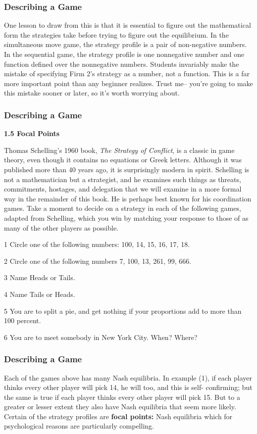  \begin{frame}[fragile]\frametitle{Describing a Game}
  One lesson to draw from this is that it is essential to figure out the
mathematical form the strategies take before trying to figure out the
equilibrium. In the simultaneous move game, the strategy profile is a pair of
non-negative numbers. In the sequential game, the strategy profile is  one
nonnegative number and one function defined over the nonnegative numbers.
Students invariably make the mistake of specifying Firm 2's strategy as a
number,   not  a function. This is a far more important point than any beginner
realizes. Trust me-- you're going to make this mistake sooner or later, so it's
worth worrying about.

\end{frame}
 \begin{frame}[fragile]\frametitle{Describing a Game}
    {\bf  1.5 Focal Points}

 
 Thomas Schelling's  1960 book, {\it The Strategy of Conflict},   is a classic
in game theory, even though it  contains no equations or Greek letters. Although
it was published more than 40 years ago, it is surprisingly modern in spirit.
Schelling is not a mathematician but a strategist, and he examines such things
as threats, commitments, hostages, and delegation that we will examine in a more
formal way in the remainder of this book.  He is perhaps best known for his
coordination games.  Take a moment to decide on a strategy in each of the
following games, adapted from Schelling, which you win by matching your response
to those of as many of the other players as possible.

 1  Circle one of the following numbers:  100, 14, 15, 16, 17, 18.

 2 Circle one of the following numbers 7, 100, 13, 261, 99, 666.

 3  Name Heads or Tails.

 4  Name Tails or Heads.

 5 You are to split a pie, and get nothing if your proportions add to
more than 100 percent.

 6  You are to meet somebody in New York City.  When?  Where?

\end{frame}
 \begin{frame}[fragile]\frametitle{Describing a Game}
  Each of the games above has many Nash equilibria. In example  (1), if  each
player thinks every other player will pick 14, he will too, and this is self-
confirming; but the same is true if each player thinks every other player will
pick 15.   But to a greater or lesser extent they also have Nash equilibria that
seem more likely.  Certain of the strategy profiles are {\bf focal points:} Nash
equilibria which for psychological reasons are particularly compelling.

\end{frame}

